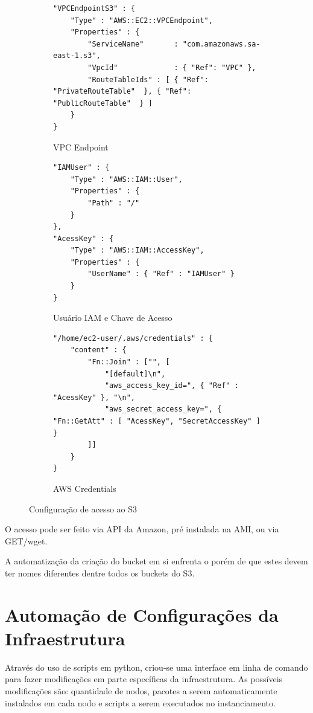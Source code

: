 \documentclass[tg]{mdtufsm}
\begin{document}
\begin{figure}
\centering

\begin{subfigure}[c]{1\textwidth}
\begin{lstlisting}[frame=single, numbers=none]
"VPCEndpointS3" : {
	"Type" : "AWS::EC2::VPCEndpoint",
	"Properties" : {
		"ServiceName"		: "com.amazonaws.sa-east-1.s3",
		"VpcId"				: { "Ref": "VPC" },
		"RouteTableIds"	: [ { "Ref": "PrivateRouteTable"  }, { "Ref": "PublicRouteTable"  } ]
	}
}
\end{lstlisting}
\caption{VPC Endpoint}
\label{vpcEndpoint}
\end{subfigure}

\begin{subfigure}[c]{1\textwidth}
\begin{lstlisting}[frame=single, numbers=none]
"IAMUser" : {
	"Type" : "AWS::IAM::User",
	"Properties" : {
		"Path" : "/"
	}
},		
"AcessKey" : {
	"Type" : "AWS::IAM::AccessKey",
	"Properties" : {
		"UserName" : { "Ref" : "IAMUser" }
	}
} 
\end{lstlisting}
\caption{Usuário IAM e Chave de Acesso}
\label{accessKey}
\end{subfigure}

\begin{subfigure}[c]{1\textwidth}
\begin{lstlisting}[frame=single, numbers=none]
"/home/ec2-user/.aws/credentials" : {
	"content" : {
		"Fn::Join" : ["", [
			"[default]\n",
			"aws_access_key_id=", { "Ref" : "AcessKey" }, "\n",
			"aws_secret_access_key=", { "Fn::GetAtt" : [ "AcessKey", "SecretAccessKey" ] }					
		]]
	}
}
\end{lstlisting}
\caption{AWS Credentials}
\label{awsCredentials}
\end{subfigure}
\caption{Configuração de acesso ao S3}
\end{figure}

O acesso pode ser feito via API da Amazon, pré instalada na AMI, ou via GET/wget.

A automatização da criação do bucket em si enfrenta o porém de que estes devem ter nomes diferentes dentre todos os buckets do S3.


\section{Automação de Configurações da Infraestrutura}

Através do uso de scripts em python, criou-se uma interface em linha de comando para fazer modificações em parte específicas da infraestrutura. As possíveis modificações são: quantidade de nodos, pacotes a serem automaticamente instalados em cada nodo e scripts a serem executados no instanciamento.
\end{document}
